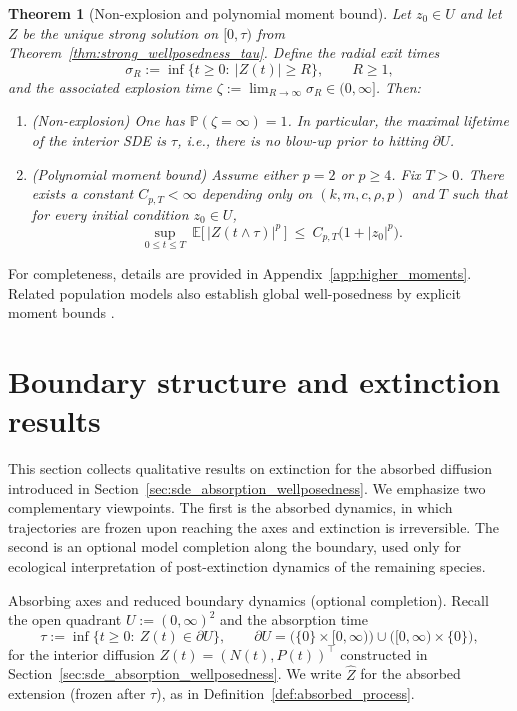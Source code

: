 \documentclass[pdflatex,sn-mathphys-ay]{sn-jnl}
\theoremstyle{thmstyleone}
\newtheorem{theorem}{Theorem}[section]
\theoremstyle{definition}
\theoremstyle{remark}
\begin{document}
\begin{theorem}[Non-explosion and polynomial moment bound]\label{thm:nonexplosion_second_moment}
Let $z_0\in U$ and let $Z$ be the unique strong solution on $[0,\tau)$ from
Theorem~\ref{thm:strong_wellposedness_tau}. Define the radial exit times
\[
\sigma_R:=\inf\{t\ge 0:\ |Z(t)|\ge R\},\qquad R\ge 1,
\]
and the associated explosion time $\zeta:=\lim_{R\to\infty}\sigma_R\in(0,\infty]$.
Then:
\begin{enumerate}[label=(\roman*)]
\item (Non-explosion) One has $\mathbb{P}(\zeta=\infty)=1$. In particular, the maximal lifetime
of the interior SDE is $\tau$, i.e., there is no blow-up prior to hitting $\partial U$.
\item (Polynomial moment bound) 
Assume either $p=2$ or $p\ge 4$. Fix $T>0$. There exists a constant $C_{p,T}<\infty$ depending only on $(k,m,c,\rho, p)$ and $T$ such that for every initial condition $z_0\in U$,
\begin{equation}\label{eq:higher_moment_bound_appD}
\sup_{0\le t\le T}\ \mathbb{E}\bigl[\,|Z(t\wedge\tau)|^p\,\bigr]\ \le\ C_{p,T}\bigl(1+|z_0|^p\bigr).
\end{equation}
\end{enumerate}
\end{theorem}

For completeness, details are provided in Appendix~\ref{app:higher_moments}. Related population models also establish global well-posedness by explicit moment bounds \citep{liang_global_2025}.

\section{Boundary structure and extinction results}
\label{sec:boundary_and_extinction_A}

This section collects qualitative results on extinction for the absorbed diffusion introduced in
Section~\ref{sec:sde_absorption_wellposedness}. 
We emphasize two complementary viewpoints. The first is the absorbed dynamics, in which trajectories are frozen upon reaching the axes and extinction is irreversible. The second is an optional model completion along the boundary, used only for ecological interpretation
of post-extinction dynamics of the remaining species. 

Absorbing axes and reduced boundary dynamics (optional completion). Recall the open quadrant $U:=(0,\infty)^2$ and the absorption time
\begin{equation}\label{eq:tau_def_boundary_A}
\tau:=\inf\{t\ge 0:\ Z(t)\in \partial U\},
\qquad \partial U=\bigl(\{0\}\times[0,\infty)\bigr)\cup\bigl([0,\infty)\times\{0\}\bigr),
\end{equation}
for the interior diffusion $Z(t)=(N(t),P(t))^\top$ constructed in Section~\ref{sec:sde_absorption_wellposedness}.
We write $\widehat Z$ for the absorbed extension (frozen after $\tau$), as in Definition~\ref{def:absorbed_process}.
\end{document}
